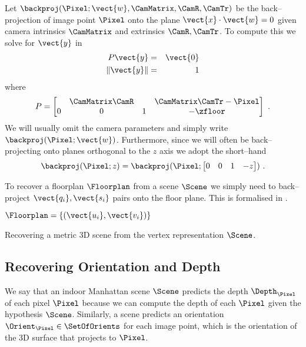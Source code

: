 Let $\backproj(\Pixel;\vect{w},\CamMatrix,\CamR,\CamTr)$ be the
back--projection of image point $\Pixel$ onto the plane
$\vect{x}\cdot\vect{w}=0$ given camera intrinsics $\CamMatrix$ and
extrinsics $\CamR,\CamTr$. To compute this we solve for $\vect{y}$ in
\begin{eqnarray}
  P \vect{y} &=& \vect{0}\\
  \| \vect{y} \| &=& 1
\end{eqnarray}
where
\begin{equation}
  P =
  \begin{bmatrix}
    & \CamMatrix\CamR & & \CamMatrix\CamTr-\Pixel \\
    0 & 0 & 1 & -\zfloor
  \end{bmatrix}~.
\end{equation}
We will usually omit the camera parameters and simply write
$\backproj(\Pixel;\vect{w})$. Furthermore, since we will often be
back--projecting onto planes orthogonal to the $z$ axis we adopt the
short--hand
\begin{equation}
  \backproj(\Pixel;z) = \backproj(\Pixel;
    \begin{bmatrix}0 & 0 & 1 & -z\end{bmatrix}) ~.
\end{equation}

To recover a floorplan $\Floorplan$ from a scene $\Scene$ we simply
need to back--project $\vect{q_i},\vect{s_i}$ pairs onto the floor
plane. This is formalised in .

\begin{algorithm}
  \begin{algorithmic}
    \ENSURE $\Floorplan=\{(\vect{u_i},\vect{v_i})\}$
    \STATE{$\Floorplan \leftarrow \emptyset$}
    \ENDFOR
  \end{algorithmic}
  \caption{\label{alg:scene-to-recon}
    Recovering a metric 3D scene from the vertex representation
    $\Scene$.}
\end{algorithm}

\subsection{Recovering Orientation and Depth}
We say that an indoor Manhattan scene $\Scene$ predicts the depth
$\Depth_{\Pixel}$ of each pixel $\Pixel$ because we can compute the
depth of each $\Pixel$ given the hypothesis $\Scene$. Similarly, a
scene predicts an orientation $\Orient_{\Pixel}\in\SetOfOrients$ for
each image point, which is the orientation of the 3D surface that
projects to $\Pixel$.

